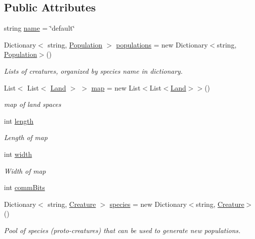 \subsection*{Public Attributes}
\begin{DoxyCompactItemize}
\item 
string \mbox{\hyperlink{class_ecosystem_ae22d1e48d43e1818705c5eda52785f63}{name}} = \char`\"{}default\char`\"{}
\item 
Dictionary$<$ string, \mbox{\hyperlink{class_population}{Population}} $>$ \mbox{\hyperlink{class_ecosystem_a8b17a9aebf9aa2619901cd3fe96c8d66}{populations}} = new Dictionary$<$string, \mbox{\hyperlink{class_population}{Population}}$>$()
\begin{DoxyCompactList}\small\item\em Lists of creatures, organized by species name in dictionary. \end{DoxyCompactList}\item 
List$<$ List$<$ \mbox{\hyperlink{class_land}{Land}} $>$ $>$ \mbox{\hyperlink{class_ecosystem_a03ba5f09ddfade51a644ec7f47349607}{map}} = new List$<$List$<$\mbox{\hyperlink{class_land}{Land}}$>$$>$()
\begin{DoxyCompactList}\small\item\em map of land spaces \end{DoxyCompactList}\item 
int \mbox{\hyperlink{class_ecosystem_a3aa718428180c38f22774b736fb4b9d3}{length}}
\begin{DoxyCompactList}\small\item\em Length of map \end{DoxyCompactList}\item 
int \mbox{\hyperlink{class_ecosystem_acd13711fb3bdc5aafb4d70ccd069d385}{width}}
\begin{DoxyCompactList}\small\item\em Width of map \end{DoxyCompactList}\item 
int \mbox{\hyperlink{class_ecosystem_a7371b349e3dcf7f22a0ab2cab61e48c8}{comm\+Bits}}
\item 
Dictionary$<$ string, \mbox{\hyperlink{class_creature}{Creature}} $>$ \mbox{\hyperlink{class_ecosystem_a3cd0f83955fce1623326b58666a6a9af}{species}} = new Dictionary$<$string, \mbox{\hyperlink{class_creature}{Creature}}$>$()
\begin{DoxyCompactList}\small\item\em Pool of species (proto-\/creatures) that can be used to generate new populations. \end{DoxyCompactList}\item 
$$
\end{DoxyCompactItemize}
